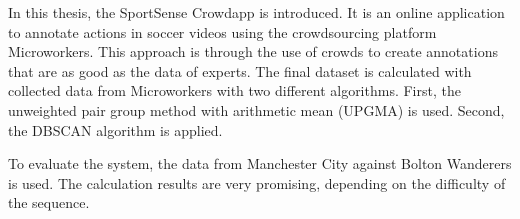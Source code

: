 In this thesis, the SportSense Crowdapp is introduced. It is an online application to annotate actions in soccer videos using the crowdsourcing platform Microworkers. This approach is through the use of crowds to create annotations that are as good as the data of experts. The final dataset is calculated with collected data from Microworkers with two different algorithms. First, the unweighted pair group method with arithmetic mean (UPGMA) \cite{Sokal:1958} is used. Second, the DBSCAN algorithm is applied.

To evaluate the system, the data from Manchester City against Bolton Wanderers is used. The calculation results are very promising, depending on the difficulty of the sequence. 